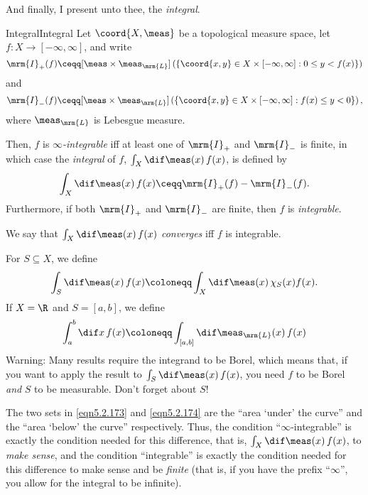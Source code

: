And finally, I present unto thee, the \emph{integral}.
\begin{dfn}{Integral}{Integral}
Let $\coord{X,\meas}$ be a topological measure space, let $f\colon X\rightarrow [-\infty ,\infty ]$, and write
\begin{equation}\label{eqn5.2.173}
\mrm{I}_+(f)\ceqq [\meas \times \meas _{\mrm{L}}]\left( \left\{ \coord{x,y}\in X\times [-\infty ,\infty ]:0\leq y<f(x)\right\} \right)
\end{equation}
and
\begin{equation}\label{eqn5.2.174}
\mrm{I}_-(f)\ceqq [\meas \times \meas _{\mrm{L}}]\left( \left\{ \coord{x,y}\in X\times [-\infty ,\infty ]:f(x)\leq y<0\right\} \right) ,
\end{equation}
where $\meas _{\mrm{L}}$ is Lebesgue measure.

Then, $f$ is \emph{$\infty$-integrable} iff at least one of $\mrm{I}_+$ and $\mrm{I}_-$ is finite, in which case the \emph{integral} of $f$, $\int _X\dif \meas (x)\, f(x)$, is defined by
\begin{equation}\label{eqn5.2.175}
\int _X\dif \meas (x)\, f(x)\ceqq \mrm{I}_+(f)-\mrm{I}_-(f).
\end{equation}
Furthermore, if both $\mrm{I}_+$ and $\mrm{I}_-$ are finite, then $f$ is \emph{integrable}.
\begin{rmk}
We say that $\int _X\dif \meas (x)\, f(x)$ \emph{converges} iff $f$ is integrable.
\end{rmk}
\begin{rmk}
For $S\subseteq X$, we define
\begin{equation}
\int _S\dif \meas (x)\, f(x)\coloneqq \int _X\dif \meas (x)\, \chi _S(x)f(x).
\end{equation}
If $X=\R$ and $S=[a,b]$, we define
\begin{equation}
\int _a^b\dif x\, f(x)\coloneqq \int _{[a,b]}\dif \meas _{\mrm{L}}(x)\, f(x)
\end{equation}
\noindent Warning:  Many results require the integrand to be Borel, which means that, if you want to apply the result to $\int _S\dif \meas (x)\, f(x)$, you need $f$ to be Borel \emph{and} $S$ to be measurable.  Don't forget about $S$!
\end{rmk}
\begin{rmk}
The two sets in \eqref{eqn5.2.173} and \eqref{eqn5.2.174} are the ``area `under' the curve'' and the ``area `below' the curve'' respectively.  Thus, the condition ``$\infty$-integrable'' is exactly the condition needed for this difference, that is, $\int _X\dif \meas (x)\, f(x)$, to \emph{make sense}, and the condition ``integrable'' is exactly the condition needed for this difference to make sense and be \emph{finite} (that is, if you have the prefix ``$\infty$'', you allow for the integral to be infinite).

\end{rmk}
\end{dfn}
